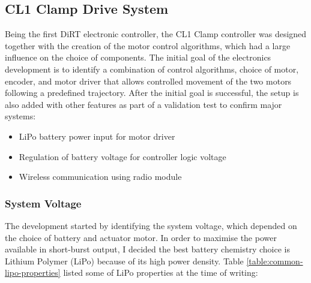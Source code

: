 \subsection{CL1 Clamp Drive System}
\label{subsection:exploration-1-cl1-clamp-electronics}

Being the first DiRT electronic controller, the CL1 Clamp controller was designed together with the creation of the motor control algorithms, which had a large influence on the choice of components. The initial goal of the electronics development is to identify a combination of control algorithms, choice of motor, encoder, and motor driver that allows controlled movement of the two motors following a predefined trajectory.
After the initial goal is successful, the setup is also added with other features as part of a validation test to confirm major systems:

\begin{itemize}[nosep]
    \item LiPo battery power input for motor driver
    \item Regulation of battery voltage for controller logic voltage
    \item Wireless communication using radio module
\end{itemize}

\subsubsection{System Voltage}
\label{subsubsection:exploration-1-system-voltage}

The development started by identifying the system voltage, which depended on the choice of battery and actuator motor. In order to maximise the power available in short-burst output, I decided the best battery chemistry choice is Lithium Polymer (LiPo) because of its high power density. Table \ref{table:common-lipo-properties} listed some of LiPo properties at the time of writing:

